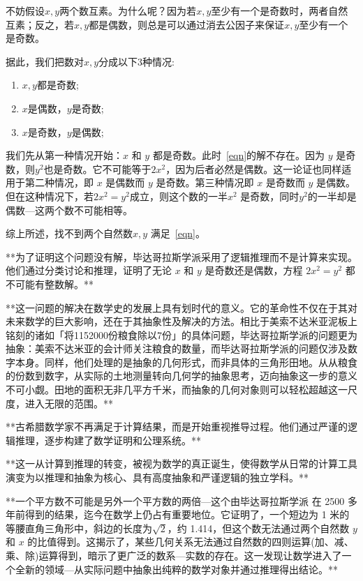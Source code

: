 不妨假设$x,y$两个数互素。为什么呢？因为若$x,y$至少有一个是奇数时，两者自然互素；反之，若$x,y$都是偶数，则总是可以通过消去公因子来保证$x,y$至少有一个是奇数。

据此，我们把数对$x,y$分成以下3种情况:
\begin{enumerate}
\item $x,y$都是奇数;
\item $x$是偶数，$y$是奇数;
\item $x$是奇数，$y$是偶数;
\end{enumerate}
我们先从第一种情况开始：$x$ 和 $y$ 都是奇数。此时~\eqref{eqn}的解不存在。因为 $y$ 是奇数，则$y^2$也是奇数。它不可能等于$2x^2$，因为后者必然是偶数。这一论证也同样适用于第二种情况，即 $x$ 是偶数而 $y$ 是奇数。第三种情况即 $x$ 是奇数而 $y$ 是偶数。但在这种情况下，若$2x^2=y^2$成立，则这个数的一半$x^2$ 是奇数，同时$y^2$的一半却是偶数---这两个数不可能相等。

综上所述，找不到两个自然数$x,y$ 满足~\eqref{eqn}。

**为了证明这个问题没有解，毕达哥拉斯学派采用了逻辑推理而不是计算来实现。他们通过分类讨论和推理，证明了无论 $x$ 和 $y$ 是奇数还是偶数，方程 $2x^2 = y^2$ 都不可能有整数解。**

**这一问题的解决在数学史的发展上具有划时代的意义。它的革命性不仅在于其对未来数学的巨大影响，还在于其抽象性及解决的方法。相比于美索不达米亚泥板上铭刻的诸如「将1152000份粮食除以7份」的具体问题，毕达哥拉斯学派的问题更为抽象：美索不达米亚的会计师关注粮食的数量，而毕达哥拉斯学派的问题仅涉及数字本身。同样，他们处理的是抽象的几何形式，而非具体的三角形田地。从从粮食的份数到数字，从实际的土地测量转向几何学的抽象思考，迈向抽象这一步的意义不可小觑。田地的面积无非几平方千米，而抽象的几何对象则可以轻松超越这一尺度，进入无限的范围。**

**古希腊数学家不再满足于计算结果，而是开始重视推导过程。他们通过严谨的逻辑推理，逐步构建了数学证明和公理系统。**

**这一从计算到推理的转变，被视为数学的真正诞生，使得数学从日常的计算工具演变为以推理和抽象为核心、具有高度抽象和严谨逻辑的独立学科。**

**一个平方数不可能是另外一个平方数的两倍---这个由毕达哥拉斯学派 在 2500 多年前得到的结果，迄今在数学上仍占有重要地位。它证明了，一个短边为 1 米的等腰直角三角形中，斜边的长度为$\sqrt{2}$，约 1.414，但这个数无法通过两个自然数 $y$ 和 $x$ 的比值得到。这揭示了，某些几何关系无法通过自然数的四则运算(加、减、乘、除)运算得到，暗示了更广泛的数系---实数的存在。这一发现让数学进入了一个全新的领域---从实际问题中抽象出纯粹的数学对象并通过推理得出结论。**

